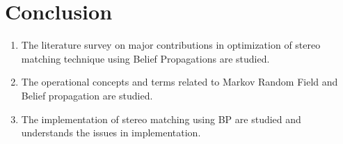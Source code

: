 \chapter{Conclusion} 
\begin{enumerate}
  \item The literature survey on major contributions in optimization of stereo matching technique  using Belief Propagations are studied.
  \item The operational concepts and terms related to Markov Random Field and Belief propagation are studied.
  \item The implementation of stereo matching using BP are studied and understands  the issues in implementation.
\end{enumerate}
